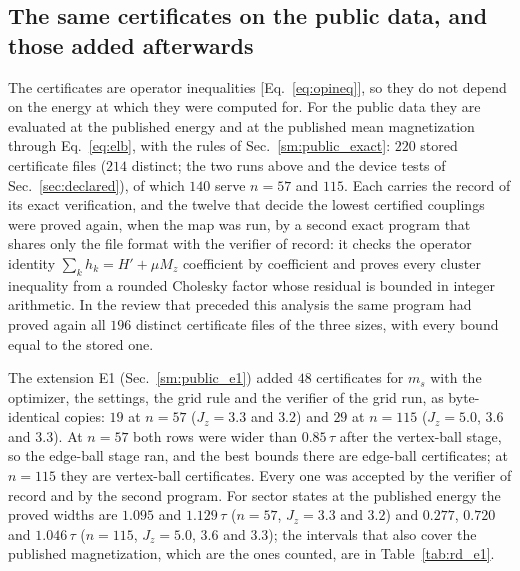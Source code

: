 \documentclass[aps,prx,onecolumn,10pt,nofootinbib,longbibliography,floatfix]{revtex4-2}
\theoremstyle{remark}
\newcommand{\Jz}{J_z}
\newcommand{\ms}{m_s}
\begin{document}
\subsection{The same certificates on the public data, and those added afterwards}
\label{sm:rigor_public}
The certificates are operator inequalities [Eq.~\eqref{eq:opineq}], so they do not depend on the energy at which
they were computed for. For the public data they are evaluated at the published energy and at the published mean
magnetization through Eq.~\eqref{eq:elb}, with the rules of Sec.~\ref{sm:public_exact}: $220$ stored certificate %
files ($214$ distinct; the two runs above and the device tests of Sec.~\ref{sec:declared}), of which $140$ serve %
$n=57$ and $115$. Each carries the record of its exact verification, and the twelve that decide the lowest certified
couplings were proved again, when the map was run, by a second exact program that shares only the file format with
the verifier of record: it checks the operator identity $\sum_kh_k=H'+\mu M_z$ coefficient by coefficient and proves
every cluster inequality from a rounded Cholesky factor whose residual is bounded in integer arithmetic. In the
review that preceded this analysis the same program had proved again all $196$ distinct certificate files of the %
three sizes, with every bound equal to the stored one.

The extension E1 (Sec.~\ref{sm:public_e1}) added $48$ certificates for $\ms$ with the optimizer, the settings, the %
grid rule and the verifier of the grid run, as byte-identical copies: $19$ at $n=57$ ($\Jz=3.3$ and $3.2$) and $29$ %
at $n=115$ ($\Jz=5.0$, $3.6$ and $3.3$). At $n=57$ both rows were wider than $0.85\,\tau$ after the vertex-ball %
stage, so the edge-ball stage ran, and the best bounds there are edge-ball certificates; at $n=115$ they are
vertex-ball certificates. Every one was accepted by the verifier of record and by the second program. For sector
states at the published energy the proved widths are $1.095$ and $1.129\,\tau$ ($n=57$, $\Jz=3.3$ and $3.2$) and %
$0.277$, $0.720$ and $1.046\,\tau$ ($n=115$, $\Jz=5.0$, $3.6$ and $3.3$); the intervals that also cover the published %
magnetization, which are the ones counted, are in Table~\ref{tab:rd_e1}.
\end{document}
